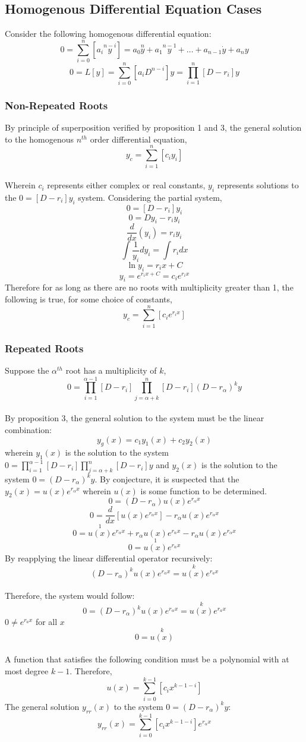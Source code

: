\documentclass[a4paper, 12pt]{report}
\def\a{\alpha}
\def\f{\frac}
\def\l{\left}
\def\r{\right}
\def\dst{\displaystyle}
\begin{document}
\begin{center}
\subsection{Homogenous Differential Equation Cases}
Consider the following homogenous differential equation:
$$0 = \sum_{i = 0}^{n}\l[a_i\overset{n-i}{y}\r] = a_0 \overset{n}{y} + a_1 \overset{n - 1}{y} + \dots + a_{n-1} \dot{y} + a_n y$$
$$0 = L[y] = \sum_{i = 0}^{n}\l[a_i D^{n - i}\r]y = \prod_{i = 1}^{n}\l[D - r_i\r]y$$
\subsubsection{Non-Repeated Roots}
By principle of superposition verified by proposition 1 and 3, the general solution to the homogenous $n^{th}$ order differential equation,
$$y_c = \sum_{i = 1}^{n}\l[c_i y_i\r]$$
\\Wherein $c_i$ represents either complex or real constants, $y_i$ represents solutions to the $0 = [D - r_i]y_i$ system. Considering the partial system,
$$0 = [D - r_i]y_i$$
$$0 = Dy_i - r_i y_i$$
$$\f{d}{dx}(y_i) = r_i y_i $$
$$\int \f{1}{y_i}dy_i = \int r_i dx $$
$$\ln{y_i} = r_i x + C$$
$$y_i = e^{r_i x + C} = c_i e^{r_i x}$$
Therefore for as long as there are no roots with multiplicity greater than 1, the following is true, for some choice of constants,
$$y_c = \sum_{i = 1}^{n}\l[c_i e^{r_i x}\r]$$
\subsubsection{Repeated Roots}
Suppose the $\a^{th}$ root has a multiplicity of $k$, 
$$0 = \prod_{i = 1}^{\a - 1}\l[D - r_i\r]\prod_{j = \a + k}^{n}\l[D - r_i\r](D - r_\a)^ky$$
\\By proposition 3, the general solution to the system must be the linear combination:
$$y_g(x) = c_1 y_1(x) + c_2 y_2(x)$$
wherein $y_1(x)$ is the solution to the system $\dst{0 = \prod_{i = 1}^{\a - 1}\l[D - r_i\r]\prod_{j = \a + k}^{n}\l[D - r_i\r]y}$ and $y_2(x)$ is the solution to the system $\dst{ 0 = (D - r_\a)^ky}$. By conjecture, it is suspected that the $\dst{y_2(x) = u(x)e^{r_\a x}}$ wherein $u(x)$ is some function to be determined. 
$$0 = (D - r_\a) u(x)e^{r_\a x}$$
$$0 = \f{d}{dx}\l[u(x)e^{r_\a x}\r] - r_\a u(x)e^{r_\a x}$$
$$0 = \overset{1}{u(x)}e^{r_\a x} + r_\a u(x)e^{r_\a x}  - r_\a u(x)e^{r_\a x}$$
$$0 = \overset{1}{u(x)}e^{r_\a x}$$
By reapplying the linear differential operator recursively:
$$(D - r_\a)^k u(x) e^{r_\a x} = \overset{k}{u(x)}e^{r_a x}$$
\\Therefore, the system would follow:
$$0 = (D - r_\a)^k u(x)e^{r_\a x} = \overset{k}{u(x)}e^{r_a x}$$
$0 \neq e^{r_a x}$ for all $x$
$$0 = \overset{k}{u(x)}$$
\\A function that satisfies the following condition must be a polynomial with at most degree $k - 1$. Therefore, 
$$u(x) = \sum_{i = 0}^{k - 1}\l[c_i x ^{k - 1 - i} \r]$$
The general solution $y_{rr}(x)$ to the system $\dst{ 0 = (D - r_\a)^ky}$:
$$y_{rr}(x) = \sum_{i = 0}^{k - 1}\l[c_i x ^{k - 1 - i} \r] e^{r_\a x}$$

\end{center}
\end{document}
